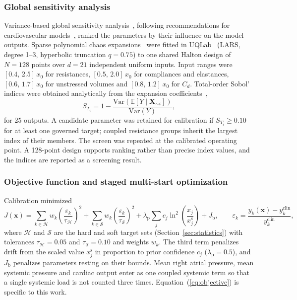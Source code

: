 \subsubsection{Global sensitivity analysis}
\label{sec:gsa}
Variance-based global sensitivity analysis~\cite{Sobol2001,Saltelli2010}, following recommendations for cardiovascular models~\cite{Eck2016}, ranked the parameters by their influence on the model outputs. Sparse polynomial chaos expansions~\cite{Blatman2011} were fitted in UQLab~\cite{Marelli2014} (LARS, degree 1--3, hyperbolic truncation $q = 0.75$) to one shared Halton design of $N = 128$ points over $d = 21$ independent uniform inputs. Input ranges were $[0.4,\,2.5]\,x_0$ for resistances, $[0.5,\,2.0]\,x_0$ for compliances and elastances, $[0.6,\,1.7]\,x_0$ for unstressed volumes and $[0.8,\,1.2]\,x_0$ for $C_d$. Total-order Sobol' indices were obtained analytically from the expansion coefficients~\cite{Sudret2008},
\begin{equation}
S_{T_i} = 1 - \frac{\mathrm{Var}\!\left(\mathbb{E}\left[Y \mid \mathbf{X}_{\sim i}\right]\right)}{\mathrm{Var}(Y)},
\label{eq:sobol}
\end{equation}
for 25 outputs. A candidate parameter was retained for calibration if $S_{T_i} \ge 0.10$ for at least one governed target; coupled resistance groups inherit the largest index of their members. The screen was repeated at the calibrated operating point. A 128-point design supports ranking rather than precise index values, and the indices are reported as a screening result.

\subsubsection{Objective function and staged multi-start optimization}
Calibration minimized
\begin{equation}
J(\mathbf{x}) = \sum_{k \in \mathcal{H}} w_k\left(\frac{\varepsilon_k}{\tau_{\mathcal{H}}}\right)^{2}
+ \sum_{k \in \mathcal{S}} w_k\left(\frac{\varepsilon_k}{\tau_{\mathcal{S}}}\right)^{2}
+ \lambda_{\mathrm{p}}\sum_{j} c_j \ln^{2}\!\left(\frac{x_j}{x_j^{\mathrm{s}}}\right) + J_{\mathrm{b}},
\qquad \varepsilon_k = \frac{y_k(\mathbf{x}) - y_k^{\mathrm{clin}}}{y_k^{\mathrm{clin}}},
\label{eq:objective}
\end{equation}
where $\mathcal{H}$ and $\mathcal{S}$ are the hard and soft target sets (Section~\ref{sec:statistics}) with tolerances $\tau_{\mathcal{H}} = 0.05$ and $\tau_{\mathcal{S}} = 0.10$ and weights $w_k$. The third term penalizes drift from the scaled value $x_j^{\mathrm{s}}$ in proportion to prior confidence $c_j$ ($\lambda_{\mathrm{p}} = 0.5$), and $J_{\mathrm{b}}$ penalizes parameters resting on their bounds. Mean right atrial pressure, mean systemic pressure and cardiac output enter as one coupled systemic term so that a single systemic load is not counted three times. Equation~(\ref{eq:objective}) is specific to this work.

